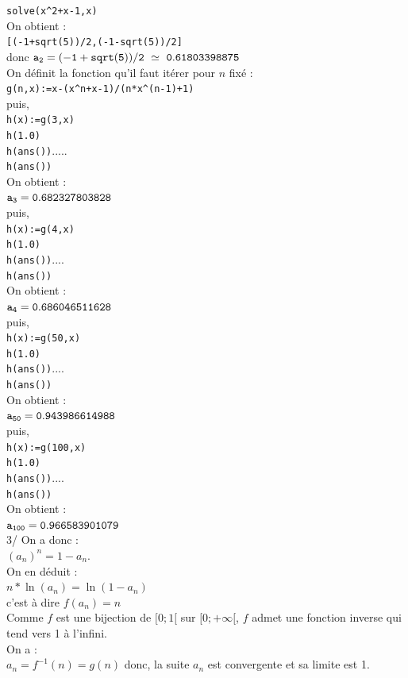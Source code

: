 \documentclass[a4paper,11pt]{book}
\begin{document}
{\tt solve(x\verb|^|2+x-1,x)}\\
On obtient :\\
{\tt [(-1+sqrt(5))/2,(-1-sqrt(5))/2]}\\
donc ${\tt a_2=(-1+sqrt(5))/2 \ \simeq\  0.61803398875}$\\
On d\'efinit la fonction qu'il faut it\'erer pour $n$ fix\'e :\\
{\tt g(n,x):={x-(x\verb|^|n+x-1)/(n*x\verb|^|(n-1)+1)}}\\
puis,\\
{\tt h(x):=g(3,x)}\\
{\tt h(1.0)}\\
{\tt h(ans())}.....\\
{\tt h(ans())}\\
On obtient :\\
${\tt a_3=0.682327803828}$\\
puis,\\
{\tt h(x):=g(4,x)}\\
{\tt h(1.0)}\\
{\tt h(ans())}....\\
{\tt h(ans())}\\
On obtient :\\
${\tt a_4=0.686046511628}$\\
puis,\\
{\tt h(x):=g(50,x)}\\
{\tt h(1.0)}\\
{\tt h(ans())}....\\
{\tt h(ans())}\\
On obtient :\\
${\tt a_{50}=0.943986614988}$\\
puis,\\
{\tt h(x):=g(100,x)}\\
{\tt h(1.0)}\\
{\tt h(ans())}....\\
{\tt h(ans())}\\
On obtient :\\
${\tt a_{100}=0.966583901079}$\\
3/ On a donc :\\
$(a_n)^n=1-a_n$.\\
On en d\'eduit :\\
$n*\ln(a_n)=\ln(1-a_n)$\\
c'est \`a dire $f(a_n)=n$\\
Comme $f$ est une bijection de $[0;1[$ sur $[0;+\infty[$, $f$ admet une 
fonction inverse qui tend vers 1 \`a l'infini.\\
On a :\\
$a_n=f^{-1}(n)=g(n)$ donc, la suite $a_n$ est convergente et sa limite est 1.
\end{document}
